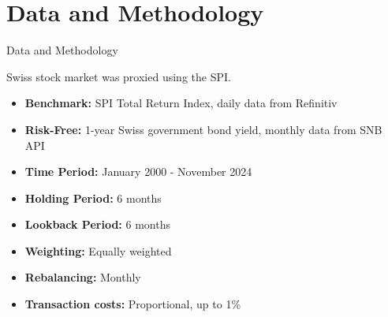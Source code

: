 \documentclass[10pt]{beamer}
\begin{document}
\section{Data and Methodology}
\begin{frame}[fragile]{Data and Methodology}

\noindent %
\begin{minipage}[t]{0.45\textwidth} %
    \begin{tcolorbox}[colframe=datagreen, colback=boxbg, coltitle=white, title=Data, sharp corners=all, fonttitle=\bfseries, left=2mm, right=2mm, enhanced, height=6cm]
        Swiss stock market was proxied using the SPI. 
        \begin{itemize}
            \item \textbf{Benchmark:} SPI Total Return Index, daily data from Refinitiv
            \item \textbf{Risk-Free:} 1-year Swiss government bond yield, monthly data from SNB API
            \item \textbf{Time Period:} January 2000 - November 2024
        \end{itemize}
    \end{tcolorbox}
\end{minipage}%
\hspace{0.05\textwidth} %
\begin{minipage}[t]{0.45\textwidth} %
    \begin{tcolorbox}[colframe=strategyblue, colback=boxbg, coltitle=white, title=Methodology, sharp corners=all, fonttitle=\bfseries, left=2mm, right=2mm, enhanced, height=6cm]
        \begin{itemize}
            \item \textbf{Holding Period:} 6 months
            \item \textbf{Lookback Period:} 6 months
            \item \textbf{Weighting:} Equally weighted
            \item \textbf{Rebalancing:} Monthly
            \item \textbf{Transaction costs:} Proportional, up to 1\%
            
        \end{itemize}
    \end{tcolorbox}
\end{minipage}

\end{frame}
\end{document}
